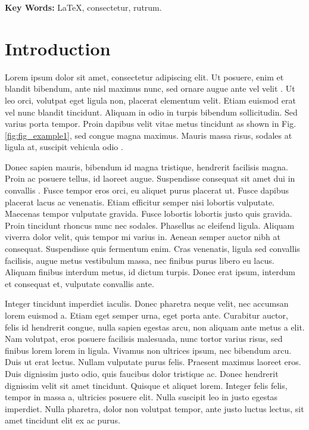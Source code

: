 \documentclass[11pt,oneside,openright]{book}
\begin{document}
\textbf{Key Words:} \LaTeX{}, consectetur, rutrum.

\mainmatter
{}

\chapter{Introduction}\label{cpt:intro}

Lorem ipsum dolor sit amet, consectetur adipiscing elit. Ut posuere, enim et blandit bibendum, ante nisl maximus nunc, sed ornare augue ante vel velit \cite{6362240}. Ut leo orci, volutpat eget ligula non, placerat elementum velit. Etiam euismod erat vel nunc blandit tincidunt. Aliquam in odio in turpis bibendum sollicitudin. Sed varius porta tempor. Proin dapibus velit vitae metus tincidunt as shown in Fig.\ref{fig:fig_example1}, sed congue magna maximus. Mauris massa risus, sodales at ligula at, suscipit vehicula odio \cite{cheng2017texture}.


Donec sapien mauris, bibendum id magna tristique, hendrerit facilisis magna. Proin ac posuere tellus, id laoreet augue. Suspendisse consequat sit amet dui in convallis \cite{jain1995machine}. Fusce tempor eros orci, eu aliquet purus placerat ut. Fusce dapibus placerat lacus ac venenatis. Etiam efficitur semper nisi lobortis vulputate. Maecenas tempor vulputate gravida. Fusce lobortis lobortis justo quis gravida. Proin tincidunt rhoncus nunc nec sodales. Phasellus ac eleifend ligula. Aliquam viverra dolor velit, quis tempor mi varius in. Aenean semper auctor nibh at consequat. Suspendisse quis fermentum enim. Cras venenatis, ligula sed convallis facilisis, augue metus vestibulum massa, nec finibus purus libero eu lacus. Aliquam finibus interdum metus, id dictum turpis. Donec erat ipsum, interdum et consequat et, vulputate convallis ante.

Integer tincidunt imperdiet iaculis. Donec pharetra neque velit, nec accumsan lorem euismod a. Etiam eget semper urna, eget porta ante. Curabitur auctor, felis id hendrerit congue, nulla sapien egestas arcu, non aliquam ante metus a elit. Nam volutpat, eros posuere facilisis malesuada, nunc tortor varius risus, sed finibus lorem lorem in ligula. Vivamus non ultrices ipsum, nec bibendum arcu. Duis ut erat lectus. Nullam vulputate purus felis. Praesent maximus laoreet eros. Duis dignissim justo odio, quis faucibus dolor tristique ac. Donec hendrerit dignissim velit sit amet tincidunt. Quisque et aliquet lorem. Integer felis felis, tempor in massa a, ultricies posuere elit. Nulla suscipit leo in justo egestas imperdiet. Nulla pharetra, dolor non volutpat tempor, ante justo luctus lectus, sit amet tincidunt elit ex ac purus.
\end{document}
